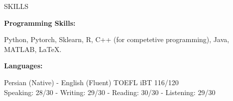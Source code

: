 \documentclass{resume} %
\begin{document}
\begin{rSection}{SKILLS}
\begin{minipage}[t]{3.2in}
\begin{center}
{\bf Programming Skills:} 

\begin{footnotesize} Python, Pytorch, Sklearn, R, C++ (for competetive programming), Java, MATLAB, \LaTeX. \end{footnotesize}
\end{center}
\end{minipage}
\hspace{0cm}
\begin{minipage}[t]{4in}
\begin{center}
{\bf Languages:}\\
\vspace{0.2cm}
\begin{footnotesize} Persian (Native) - English (Fluent) TOEFL iBT 116/120\\ Speaking: 28/30 - Writing: 29/30 - Reading: 30/30 - Listening: 29/30 
\end{footnotesize}
\end{center}
\end{minipage}
\end{rSection}
\end{document}
